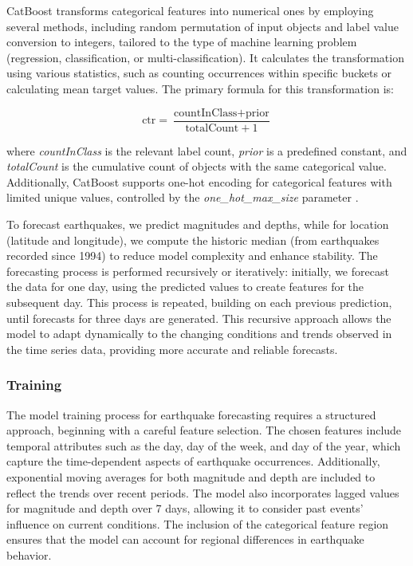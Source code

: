 CatBoost transforms categorical features into numerical ones by employing
several methods, including random permutation of input objects and label
value conversion to integers, tailored to the type of machine learning problem
(regression, classification, or multi-classification). It calculates the
transformation using various statistics, such as counting occurrences within
specific buckets or calculating mean target values. The primary formula for
this transformation is:

\[\text{ctr} = \frac{\text{countInClass} + \text{prior}}{\text{totalCount} + 1}\]

where \textit{countInClass} is the relevant label count, \textit{prior} is a
predefined constant, and \textit{totalCount} is the cumulative count of objects
with the same categorical value. Additionally, CatBoost supports one-hot encoding
for categorical features with limited unique values, controlled by the
\textit{one\_hot\_max\_size} parameter \parencite{catboost-encoding}.

To forecast earthquakes, we predict magnitudes and depths, while for location
(latitude and longitude), we compute the historic median
(from earthquakes recorded since 1994) to reduce model
complexity and enhance stability. The forecasting process is performed
recursively or iteratively: initially, we forecast the data for one day,
using the predicted values to create features for the subsequent day.
This process is repeated, building on each previous prediction, until
forecasts for three days are generated. This recursive approach allows
the model to adapt dynamically to the changing conditions and trends
observed in the time series data, providing more accurate and reliable forecasts.

\subsubsection{Training}
The model training process for earthquake forecasting requires a structured
approach, beginning with a careful feature selection. The chosen features
include temporal attributes such as the day, day of the week, and day of
the year, which capture the time-dependent aspects of earthquake occurrences.
Additionally, exponential moving averages for both magnitude and depth are
included to reflect the trends over recent periods. The model also incorporates
lagged values for magnitude and depth over 7 days, allowing it to
consider past events' influence on current conditions. The inclusion of the
categorical feature region ensures that the model can account for regional
differences in earthquake behavior.

